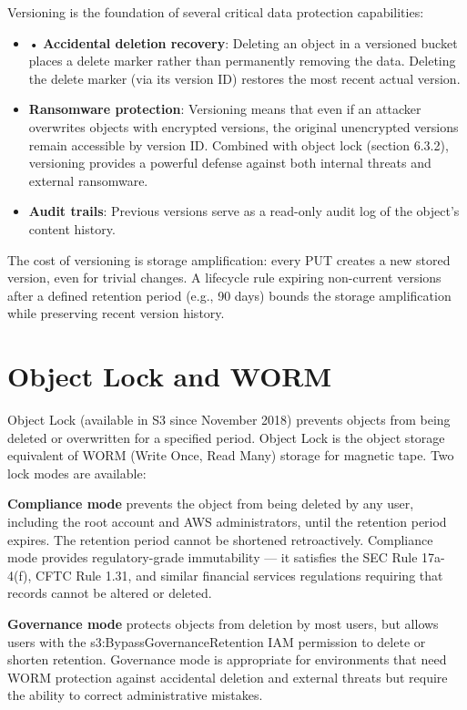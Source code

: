 Versioning is the foundation of several critical data protection capabilities:

\begin{itemize}
  \item • \textbf{Accidental deletion recovery}: Deleting an object in a versioned bucket places a delete marker rather than permanently removing the data. Deleting the delete marker (via its version ID) restores the most recent actual version.
  \item \textbf{Ransomware protection}: Versioning means that even if an attacker overwrites objects with encrypted versions, the original unencrypted versions remain accessible by version ID. Combined with object lock (section 6.3.2), versioning provides a powerful defense against both internal threats and external ransomware.
  \item \textbf{Audit trails}: Previous versions serve as a read-only audit log of the object's content history.
\end{itemize}

The cost of versioning is storage amplification: every PUT creates a new stored version, even for trivial changes. A lifecycle rule expiring non-current versions after a defined retention period (e.g., 90 days) bounds the storage amplification while preserving recent version history.

\section{Object Lock and WORM}
Object Lock (available in S3 since November 2018) prevents objects from being deleted or overwritten for a specified period. Object Lock is the object storage equivalent of WORM (Write Once, Read Many) storage for magnetic tape. Two lock modes are available:

\textbf{Compliance mode} prevents the object from being deleted by any user, including the root account and AWS administrators, until the retention period expires. The retention period cannot be shortened retroactively. Compliance mode provides regulatory-grade immutability --- it satisfies the SEC Rule 17a-4(f), CFTC Rule 1.31, and similar financial services regulations requiring that records cannot be altered or deleted.

\textbf{Governance mode} protects objects from deletion by most users, but allows users with the s3:BypassGovernanceRetention IAM permission to delete or shorten retention. Governance mode is appropriate for environments that need WORM protection against accidental deletion and external threats but require the ability to correct administrative mistakes.

